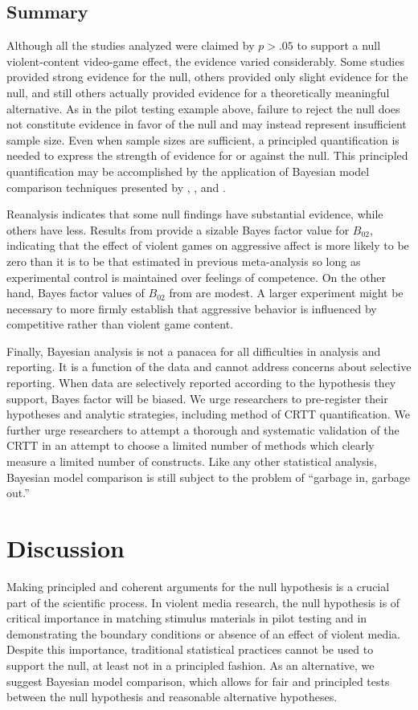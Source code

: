 \documentclass[man]{apa6}
\begin{document}
\subsection{Summary}
Although all the studies analyzed were claimed by $p>.05$ to support a null violent-content video-game effect, the evidence varied considerably.  Some studies provided strong evidence for the null, others provided only slight evidence for the null, and still others actually provided evidence for a theoretically meaningful alternative. As in the pilot testing example above, failure to reject the null does not constitute evidence in favor of the null and may instead represent insufficient sample size. Even when sample sizes are sufficient, a principled quantification is needed to express the strength of evidence for or against the null. This principled quantification may be accomplished by the application of Bayesian model comparison techniques presented by \citet{Rouder:Morey:2012}, \citet{Rouder:etal:2012}, and \citet{Dienes:2011, Dienes:2014}. 

Reanalysis indicates that some null findings have substantial evidence, while others have less. Results from \citet{Przybylski:etal:2014} provide a sizable Bayes factor value for $B_{02}$, indicating that the effect of violent games on aggressive affect is more likely to be zero than it is to be that estimated in previous meta-analysis so long as experimental control is maintained over feelings of competence. On the other hand, Bayes factor values of $B_{02}$ from \citet{Adachi:Willoughby:2011} are modest.  A larger experiment might be necessary to more firmly establish that aggressive behavior is influenced by competitive rather than violent game content.

Finally, Bayesian analysis is not a panacea for all difficulties in analysis and reporting.  It is a function of the data and cannot address concerns about selective reporting.  When data are selectively reported according to the hypothesis they support, Bayes factor will be biased. We urge researchers to pre-register their hypotheses and analytic strategies, including method of CRTT quantification. We further urge researchers to attempt a thorough and systematic validation of the CRTT in an attempt to choose a limited number of methods which clearly measure a limited number of constructs. Like any other statistical analysis, Bayesian model comparison is still subject to the problem of ``garbage in, garbage out.''

\section{Discussion} 
Making principled and coherent arguments for the null hypothesis is a crucial part of the scientific process. In violent media research, the null hypothesis is of critical importance in matching stimulus materials in pilot testing and in demonstrating the boundary conditions or absence of an effect of violent media. Despite this importance, traditional statistical practices cannot be used to support the null, at least not in a principled fashion. As an alternative, we suggest Bayesian model comparison, which allows for fair and principled tests between the null hypothesis and reasonable alternative hypotheses.
\end{document}
